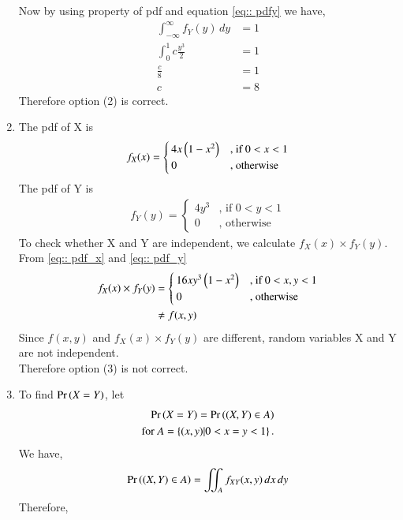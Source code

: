 \documentclass[journal,12pt,twocolumn]{IEEEtran}
\begin{document}
\begin{enumerate}
Now by using property of pdf  and equation \eqref{eq:: pdfy} we have,
\begin{align}
    \int_{-\infty}^{\infty} f_Y(y) \,dy &= 1 \\
    \int_{0}^{1} c\frac{y^3}{2} & =1 \\
    \frac{c}{8} &= 1 \\
    c & = 8
\end{align}
Therefore option (2) is correct. \\
\item
The pdf of X is 
\begin{align}
\label{eq:: pdf_x}
f_X(x)  = 
\begin{cases}
4x \left(1- x^2\right) & \text{, if } 0<x<1
\\
0 & \text{, otherwise }
\end{cases}
\end{align} 
The pdf of Y is 
 \begin{align}
\label{eq:: pdf_y}
f_Y(y)  = 
\begin{cases}
 4y^3 & \text{, if } 0<y<1
\\
0 & \text{, otherwise }
\end{cases}
\end{align}   
To check whether X and Y are independent, we calculate $ f_X(x) \times f_Y(y)  $. From \eqref{eq:: pdf_x} and \eqref{eq:: pdf_y}
\begin{align}
f_X(x) \times f_Y(y) & = 
\begin{cases}
16xy^3 \left(1- x^2\right) & \text{, if } 0<x,y<1 
\\
0 & \text{, otherwise }
\end{cases}
\\
  &\neq f(x,y)
\end{align} 
Since $f(x,y) $ and $ f_X(x) \times f_Y(y) $ are different, random variables X and Y are not independent. \\ 
Therefore option (3) is not correct. \\
\item
To find $ \Pr\left( X = Y \right) $, let
\begin{align}
    \Pr\left( X = Y\right) = \Pr\left((X,Y) \in A \right) \\ 
    \text{for } A = \left\{(x,y)| 0< x=y < 1\right\}.
\end{align}
We have,
\begin{align}
    \Pr\left((X,Y) \in A \right) =  \iint_A f_{XY}(x,y) \,dx\,dy
\end{align}
Therefore,
\begin{align}
\label{eq::1}

\end{align}
\end{enumerate}
\end{document}
